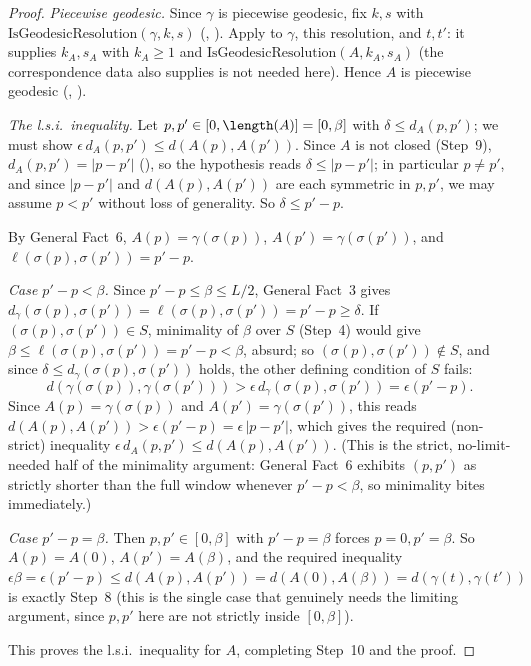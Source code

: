 \begin{proof}
  \emph{Piecewise geodesic.} Since $\gamma$ is piecewise geodesic, fix $k,s$ with
  $\mathrm{IsGeodesicResolution}(\gamma,k,s)$ (,
  ). Apply  to $\gamma$, this
  resolution, and $t,t'$: it supplies $k_A,s_A$ with $k_A \ge 1$ and
  $\mathrm{IsGeodesicResolution}(A,k_A,s_A)$ (the correspondence data 
  also supplies is not needed here). Hence $A$ is piecewise geodesic
  (, ).

  \emph{The l.s.i.\ inequality.} Let $p,p' \in [0,\length(A)]=[0,\beta]$ with $\delta \le d_A(p,p')$;
  we must show $\epsilon\, d_A(p,p') \le d(A(p),A(p'))$. Since $A$ is not closed (Step~9), $d_A(p,p')
  = |p-p'|$ (), so the hypothesis reads $\delta \le |p-p'|$; in particular $p \ne
  p'$, and since $|p-p'|$ and $d(A(p),A(p'))$ are each symmetric in $p,p'$, we may assume $p<p'$
  without loss of generality. So $\delta \le p'-p$.

  By General Fact~6, $A(p)=\gamma(\sigma(p))$, $A(p')=\gamma(\sigma(p'))$, and
  $\ell(\sigma(p),\sigma(p'))=p'-p$.

  \emph{Case $p'-p < \beta$.} Since $p'-p \le \beta \le L/2$, General Fact~3 gives
  $d_\gamma(\sigma(p),\sigma(p')) = \ell(\sigma(p),\sigma(p')) = p'-p \ge \delta$. If
  $(\sigma(p),\sigma(p')) \in S$, minimality of $\beta$ over $S$ (Step~4) would give $\beta \le
  \ell(\sigma(p),\sigma(p')) = p'-p < \beta$, absurd; so $(\sigma(p),\sigma(p'))\notin S$, and since
  $\delta \le d_\gamma(\sigma(p),\sigma(p'))$ holds, the other defining condition of $S$ fails:
  \[
    d(\gamma(\sigma(p)),\gamma(\sigma(p'))) > \epsilon\, d_\gamma(\sigma(p),\sigma(p')) =
    \epsilon(p'-p)
    .
  \]
  Since $A(p)=\gamma(\sigma(p))$ and $A(p')=\gamma(\sigma(p'))$, this reads $d(A(p),A(p')) >
  \epsilon(p'-p) = \epsilon\,|p-p'|$, which gives the required (non-strict) inequality $\epsilon\,
  d_A(p,p') \le d(A(p),A(p'))$. (This is the strict, no-limit-needed half of the minimality
  argument: General Fact~6 exhibits $(p,p')$ as strictly shorter than the full window whenever
  $p'-p<\beta$, so minimality bites immediately.)

  \emph{Case $p'-p = \beta$.} Then $p,p'\in[0,\beta]$ with $p'-p=\beta$ forces $p=0,p'=\beta$. So
  $A(p)=A(0)$, $A(p')=A(\beta)$, and the required inequality $\epsilon\beta = \epsilon(p'-p) \le
  d(A(p),A(p')) = d(A(0),A(\beta)) = d(\gamma(t),\gamma(t'))$ is exactly Step~8 (this is the single
  case that genuinely needs the limiting argument, since $p,p'$ here are not strictly inside
  $[0,\beta]$).

  This proves the l.s.i.\ inequality for $A$, completing Step~10 and the proof.
\end{proof}
